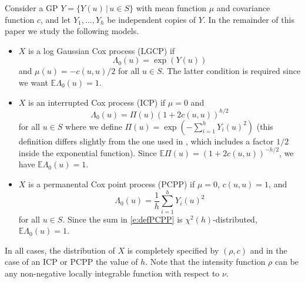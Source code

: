 \documentclass[alpha-refs]{wiley-article}
\begin{document}
Consider a GP $Y=\{Y(u)\,|\,u\in S\}$ with mean function $\mu$ and covariance function $c$, and let $Y_1,\ldots,Y_h$ be independent copies of $Y$.
In the remainder of this paper we study the following models.
\begin{itemize}
\item $X$ is a log Gaussian Cox process (LGCP) if 
\begin{equation}\label{e:defLGCP}
\Lambda_0(u)=\exp(Y(u))
\end{equation}
and $\mu(u)=-c(u,u)/2$ for all $u\in S$. The latter condition is required 
 since we want $\mathbb E\Lambda_0(u)=1$.  
\item $X$ is an interrupted Cox process (ICP) if 
 $\mu=0$ and 
\begin{equation}\label{e:defInter}
\Lambda_0(u)=\Pi(u)(1+2c(u,u))^{h/2}
\end{equation}
for all $u\in S$ where we define $\Pi(u)=\exp(-\sum_{i=1}^h Y_i(u)^2)$ (this definition differs slightly from the one used in \cite{FredMe}, which includes a factor $1/2$ inside the exponential function). Since $\mathbb E\Pi(u)=(1+2c(u,u))^{-h/2}$, we have $\mathbb E\Lambda_0(u)=1$. 
\item  $X$ is a permanental Cox point process (PCPP) if $\mu=0$, $c(u,u)=1$, and %
\begin{equation}\label{e:defPCPP}
\Lambda_0(u)=\frac{1}{h}\sum_{i=1}^h Y_i(u)^2
\end{equation}
for all $u\in S$. Since the sum in \eqref{e:defPCPP} is $\chi^2(h)$-distributed, $\mathbb E\Lambda_0(u)=1$.
\end{itemize}
In all cases, the distribution of $X$ is completely specified by $(\rho,c)$ and in the case of an ICP or PCPP the value of $h$. 
Note that the intensity function $\rho$ can be any non-negative locally integrable function with respect to $\nu$.




\end{document}
